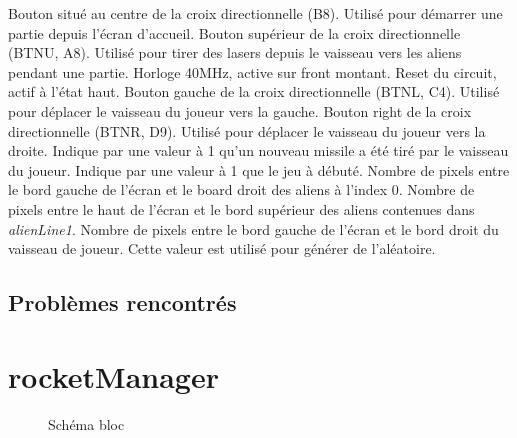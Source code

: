 \documentclass[french]{nakrule}
\begin{document}
\begin{descr}
   Bouton situé au centre de la croix directionnelle (B8).
  Utilisé pour démarrer une partie depuis l'écran d'accueil.
   Bouton supérieur de la croix directionnelle (BTNU, A8).
  Utilisé pour tirer des lasers depuis le vaisseau vers les aliens pendant une partie.
   Horloge 40MHz, active sur front montant.
   Reset du circuit, actif à l'état haut.
   Bouton gauche de la croix directionnelle (BTNL, C4). Utilisé
  pour déplacer le vaisseau du joueur vers la gauche.
   Bouton right de la croix directionnelle (BTNR, D9). Utilisé
  pour déplacer le vaisseau du joueur vers la droite.
   Indique par une valeur à 1 qu'un nouveau missile a été
  tiré par le vaisseau du joueur.
   Indique par une valeur à 1 que le jeu à débuté.
   Nombre de pixels entre le bord gauche de l'écran et le
  board droit des aliens à l'index 0.
   Nombre de pixels entre le haut de l'écran et le bord
  supérieur des aliens contenues dans \emph{alienLine1}.
   Nombre de pixels entre le bord gauche de l'écran et
  le bord droit du vaisseau de joueur. Cette valeur est utilisé pour générer de l'aléatoire.
\end{descr}


\subsection{Problèmes rencontrés}
\label{subsec:Problemes_rencontres_input}


\clearpage

\section{rocketManager}
\label{sec:rocketmanager}

\begin{figure}
\caption{Schéma bloc}
\label{rocketManagerBloc}
\end{figure}
\end{document}
